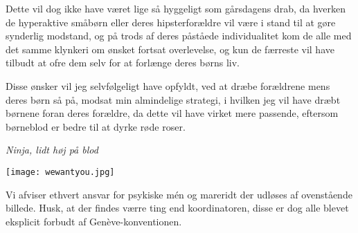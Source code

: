 \begin{minipage}[b]{0.95\linewidth}
\begin{minipage}[t]{0.47\textwidth}
Dette vil dog ikke have været lige så hyggeligt som gårsdagens drab, da hverken de hyperaktive småbørn eller deres hipsterforældre vil være i stand til at gøre synderlig modstand, og på trods af deres påståede individualitet kom de alle med det samme klynkeri om ønsket fortsat overlevelse, og kun de færreste vil have tilbudt at ofre dem selv for at forlænge deres børns liv. 

Disse ønsker vil jeg selvfølgeligt have opfyldt, ved at dræbe forældrene mens deres børn så på, modsat min almindelige strategi, i hvilken jeg vil have dræbt børnene foran deres forældre, da dette vil have virket mere passende, eftersom børneblod er bedre til at dyrke røde roser.

{\flushright\emph{Ninja, lidt høj på blod}}

\vspace{2mm}
\texttt{[image: wewantyou.jpg]}

Vi afviser ethvert ansvar for psykiske mén og mareridt der udløses af ovenstående billede. Husk, at der findes værre ting end koordinatoren, disse er dog alle blevet eksplicit forbudt af Genève-konventionen.


\end{minipage}
\end{minipage}

